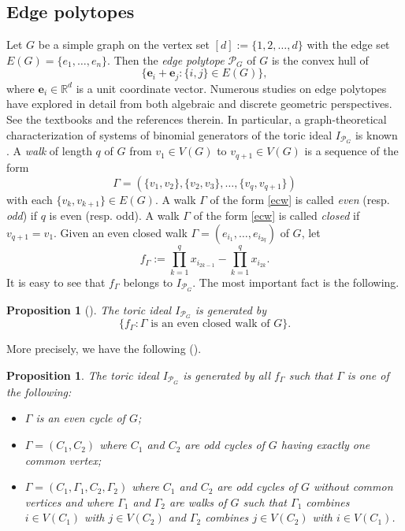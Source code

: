 \documentclass[12pt]{amsart}
\newtheorem{prop}[thm]{Proposition}
\theoremstyle{definition}
\numberwithin{thm}{section}
\numberwithin{equation}{section}
\def\epoly{{\mathcal P}_G}
\def\NZQ{\mathbb}               %
\def\RR{{\NZQ R}}
\def\eb{{\mathbf e}}
\begin{document}
\subsection{Edge polytopes}

Let $G$ be a simple graph on the vertex set $[d]:= \{1,2,\dots,d\}$
with the edge set $E(G)=\{e_1,\dots, e_n \}$.
Then the {\em edge polytope} $\epoly$ of $G$ is the convex hull of
\[
\{
\eb_i + \eb_j : \{i,j\} \in E(G)
\},
\]
where $\eb_i \in \RR^d$ is a unit coordinate vector.
Numerous studies on edge polytopes have explored in detail
 from both algebraic and discrete geometric perspectives.
See the textbooks \cite{HHO, V} and the references therein.
In particular, a graph-theoretical characterization of systems of binomial generators of the toric ideal $I_{\epoly}$ is known \cite{Vecw}.
A {\it walk} of length $q$ of $G$ from $v_1 \in V(G)$ to $v_{q+1} \in V(G)$ is a sequence of the form 
\begin{equation} \label{ecw}
    \Gamma =(\{v_1,v_2\}, \{v_2,v_3\}, \dots,\{v_q,v_{q+1}\})
\end{equation}
with each $\{v_k,v_{k+1} \} \in E(G)$.
A walk $\Gamma$ of the form \eqref{ecw} is called {\it even} (resp. {\it odd}) if $q$ is even  (resp. odd).
A walk $\Gamma$ of the form \eqref{ecw} is called 
{\it closed} if $v_{q+1} = v_1$.
Given an even closed walk $    \Gamma =(e_{i_1}, \dots, e_{i_{2q}})$ of $G$, let
   $$
    f_\Gamma := \prod_{k=1}^q x_{i_{2k-1}} - \prod_{k=1}^q x_{i_{2k}}
    .$$
It is easy to see that $f_\Gamma$ belongs to $I_{\epoly}$.
The most important fact is the following.

\begin{prop}[{\cite[Proposition 3.1]{Vecw}}]
    The toric ideal $I_{\epoly}$ is generated by 
    $$\{ f_\Gamma : \Gamma \mbox{ is an even closed walk of }G \}.$$
\end{prop}

More precisely, we have the following (\cite[Lemmas 5.10 and 5.11]{HHO}).

\begin{prop}\label{edge gene}
    The toric ideal $I_{\epoly}$ is generated by all $f_\Gamma$ such that $\Gamma$ is one of the following{\rm :}
    \begin{itemize}
        \item[(i)]
        $\Gamma$ is an even cycle of $G${\rm ;}
        \item[(ii)]
        $\Gamma=(C_1,C_2)$ where $C_1$ and $C_2$ are odd cycles of $G$ having exactly one common vertex{\rm ;}
        \item[(iii)]
        $\Gamma=(C_1,\Gamma_1,C_2,\Gamma_2)$ where $C_1$ and $C_2$ are odd cycles of $G$ without common vertices and where $\Gamma_1$ and $\Gamma_2$ are walks of $G$ such that $\Gamma_1$ combines $i \in V(C_1)$ with $j \in V(C_2)$
        and $\Gamma_2$ combines $j \in V(C_2)$ with $i \in V(C_1)$. 
    \end{itemize}


\end{prop}
\end{document}
